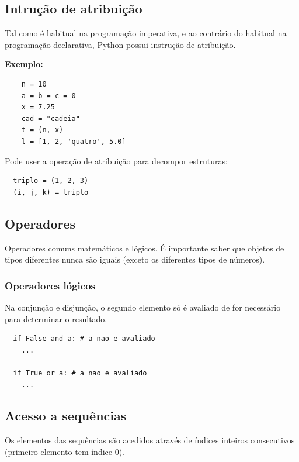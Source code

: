 \documentclass{article}
\begin{document}
\subsection{Intrução de atribuição}

Tal como é habitual na programação imperativa, e ao
contrário do habitual na programação declarativa,
Python possui instrução de atribuição.

\begin{flushleft}
  \textbf{Exemplo:}
  \begin{lstlisting}
    n = 10
    a = b = c = 0
    x = 7.25
    cad = "cadeia"
    t = (n, x)
    l = [1, 2, 'quatro', 5.0]
  \end{lstlisting}
\end{flushleft}

Pode user a operação de atribuição para decompor estruturas:
\begin{lstlisting}
  triplo = (1, 2, 3)
  (i, j, k) = triplo
\end{lstlisting}

\subsection{Operadores}

Operadores comuns matemáticos e lógicos. É importante saber que objetos de
tipos diferentes nunca são iguais (exceto os diferentes tipos de números).

\subsubsection{Operadores lógicos}

Na conjunção e disjunção, o segundo elemento só é avaliado de for necessário para determinar
o resultado.

\begin{lstlisting}
  if False and a: # a nao e avaliado
    ...

  if True or a: # a nao e avaliado
    ...
\end{lstlisting}

\pagebreak

\subsection{Acesso a sequências}

Os elementos das sequências são acedidos
através de índices inteiros consecutivos (primeiro elemento tem índice 0).
\end{document}

